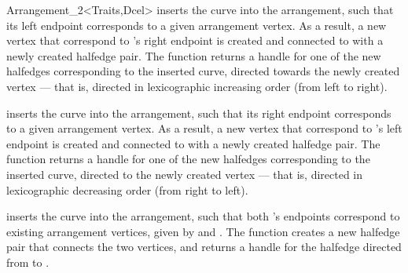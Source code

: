 \begin{ccRefClass}{Arrangement_2<Traits,Dcel>}
  {inserts the curve  into the arrangement, such that its left
   endpoint corresponds to a given arrangement vertex. As a result, a new
   vertex that correspond to 's right endpoint is created and
   connected to  with a newly created halfedge pair. 
   The function returns a handle for one of the new halfedges corresponding
   to the inserted curve, directed towards the newly created vertex ---
   that is, directed in lexicographic increasing order (from left to right).
   }

  {inserts the curve  into the arrangement, such that its right
   endpoint corresponds to a given arrangement vertex. As a result, a new
   vertex that correspond to 's left endpoint is created and
   connected to  with a newly created halfedge pair. 
   The function returns a handle for one of the new halfedges corresponding
   to the inserted curve, directed to the newly created vertex ---
   that is, directed in lexicographic decreasing order (from right to left).
   }

  {inserts the curve  into the arrangement, such that both 's
   endpoints correspond to existing arrangement vertices, given by 
   and . The function creates a new halfedge pair that connects the
   two vertices, and returns a handle for the halfedge directed from 
   to .
   }


\end{ccRefClass}
